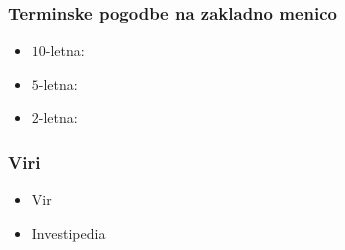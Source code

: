 \documentclass[14pt]{beamer}
\begin{document}
\begin{frame}
    \frametitle{Terminske pogodbe na zakladno menico}
    
    \begin{itemize}
        \item $10$-letna:
        \item $5$-letna:
        \item $2$-letna:
    \end{itemize}


\end{frame}


\begin{frame}
    \frametitle{Viri}
    
    \begin{itemize}
        \item Vir 
        \item Investipedia
    \end{itemize}

\end{frame}
\end{document}
